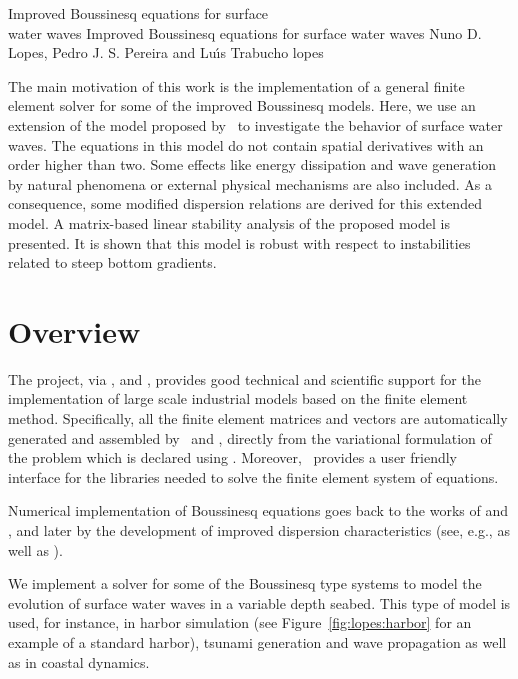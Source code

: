               {Improved Boussinesq equations for surface \\ water waves}
              {Improved Boussinesq equations for surface water waves}
              {Nuno D. Lopes, Pedro J. S. Pereira and Lu{\'\i}s Trabucho}
              {lopes}

The main motivation of this work is the implementation of a general
finite element solver for some of the improved Boussinesq
models. Here, we use an extension of the
model proposed by~\citet{ZhaoTengCheng2004} to investigate the
behavior of surface water waves. The equations in this model do not
contain spatial derivatives with an order higher than two. Some
effects like energy dissipation and wave generation by natural
phenomena or external physical mechanisms are also included. As a
consequence, some modified dispersion relations are derived for this
extended model. A matrix-based linear stability analysis of the
proposed model is presented. It is shown that this model is robust
with respect to instabilities related to steep bottom gradients.

\section{Overview}

The \fenics project, via \dolfin, \ufl and \ffc, provides good
technical and scientific support for the implementation of large scale
industrial models based on the finite element method. Specifically,
all the finite element matrices and vectors are automatically
generated and assembled by \dolfin\ and \ffc, directly from the
variational formulation of the problem which is declared using
\ufl. Moreover, \dolfin\ provides a user friendly interface for the
libraries needed to solve the finite element system of equations.

Numerical implementation of Boussinesq equations goes back to the
works of \citet{Peregrine1967} and \citet{Wu1981}, and later by the
development of improved dispersion characteristics (see, e.g.,
\citet{MadsenEtAl1991,Nwogu1993,ChenLiu1994} as well as
\citet{BejiNadaoka1996}).

We implement a solver for some of the Boussinesq type systems to model
the evolution of surface water waves in a variable
depth seabed.  This type of model is used, for instance, in harbor
simulation (see Figure~\ref{fig:lopes:harbor} for an example of a
standard harbor), tsunami generation and wave propagation as well as
in coastal dynamics.

